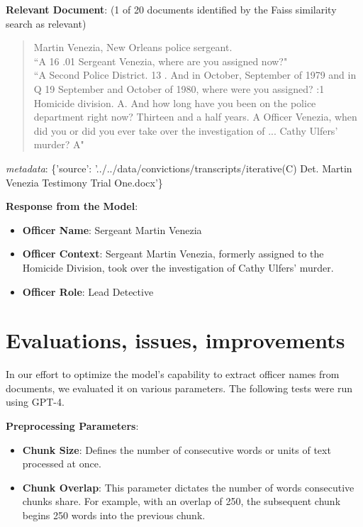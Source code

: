 \documentclass{article}
\begin{document}
\vspace{1em} 

\noindent \textbf{Relevant Document}:  
(1 of 20 documents identified by the Faiss similarity search as relevant)

\begin{quote}
Martin Venezia, New Orleans police sergeant.\\
``A 16 .01 Sergeant Venezia, where are you assigned now?"\\
``A Second Police District. 13 . And in October, September of 1979 and in Q 19 September and October of 1980, where were you assigned? :1 Homicide division. A. And how long have you been on the police department right now? Thirteen and a half years. A Officer Venezia, when did you or did you ever take over the investigation of ... Cathy Ulfers' murder? A"
\end{quote}

\vspace{1em} 

\textit{metadata}: \{'source': '../../data/convictions/transcripts/iterative(C) Det. Martin Venezia Testimony Trial One.docx'\}

\vspace{1em}

\noindent \textbf{Response from the Model}:

\begin{itemize}
    \item \textbf{Officer Name}: Sergeant Martin Venezia  
    \item \textbf{Officer Context}: Sergeant Martin Venezia, formerly assigned to the Homicide Division, took over the investigation of Cathy Ulfers' murder.  
    \item \textbf{Officer Role}: Lead Detective
\end{itemize}

\section{Evaluations, issues, improvements}

In our effort to optimize the model's capability to extract officer names from documents, we evaluated it on various parameters. The following tests were run using GPT-4.

\noindent \textbf{Preprocessing Parameters}:
\begin{itemize}
    \item \textbf{Chunk Size}: Defines the number of consecutive words or units of text processed at once.
    \item \textbf{Chunk Overlap}: This parameter dictates the number of words consecutive chunks share. For example, with an overlap of 250, the subsequent chunk begins 250 words into the previous chunk.
\end{itemize}
\end{document}
